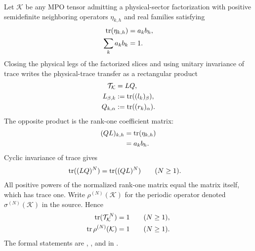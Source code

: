 \documentclass{article}
\begin{document}
Let $\mathcal K$ be any MPO tensor admitting a physical-sector factorization
with positive semidefinite neighboring operators $\eta_{k,h}$ and real
families satisfying
\begin{align}
    \operatorname{tr}(\eta_{k,h})
        &= a_kb_h,
    \label{eq:cpgsv17_neighboring_rank_one_trace}\\
    \sum_k a_kb_k
        &= 1.
    \label{eq:cpgsv17_neighboring_trace_normalization}
\end{align}
Closing the physical legs of the factorized slices and using unitary
invariance of trace writes the physical-trace transfer as a rectangular
product
\begin{align}
    \mathcal T_{\mathcal K}
        &= LQ,
    \label{eq:cpgsv17_physical_trace_rectangular_product}\\
    L_{\beta,k}
        &:= \operatorname{tr}((l_k)_\beta),
    \label{eq:cpgsv17_left_trace_matrix}\\
    Q_{k,\alpha}
        &:= \operatorname{tr}((r_k)_\alpha).
    \label{eq:cpgsv17_right_trace_matrix}
\end{align}
The opposite product is the rank-one coefficient matrix:
\begin{align}
    (QL)_{k,h}
        &= \operatorname{tr}(\eta_{k,h})
    \label{eq:cpgsv17_opposite_product_neighboring_trace}\\
        &= a_kb_h.
    \label{eq:cpgsv17_opposite_product_rank_one}
\end{align}
Cyclic invariance of trace gives
\begin{align}
    \operatorname{tr}((LQ)^N)
        &= \operatorname{tr}((QL)^N)
        \qquad (N\geq 1).
    \label{eq:cpgsv17_rectangular_power_trace_cyclicity}
\end{align}
All positive powers of the normalized rank-one matrix equal the matrix itself,
which has trace one. Write $\rho^{(N)}(\mathcal K)$ for the periodic operator
denoted $\sigma^{(N)}(\mathcal K)$ in the source. Hence
\begin{align}
    \operatorname{tr}(\mathcal T_{\mathcal K}^{\,N})
        &= 1
        \qquad (N\geq 1),
    \label{eq:cpgsv17_unit_transfer_power_trace}\\
    \operatorname{tr}\rho^{(N)}(\mathcal K)
        &= 1
        \qquad (N\geq 1).
    \label{eq:cpgsv17_unit_periodic_operator_trace}
\end{align}
The formal statements are
,
,
and
in .
\end{document}

